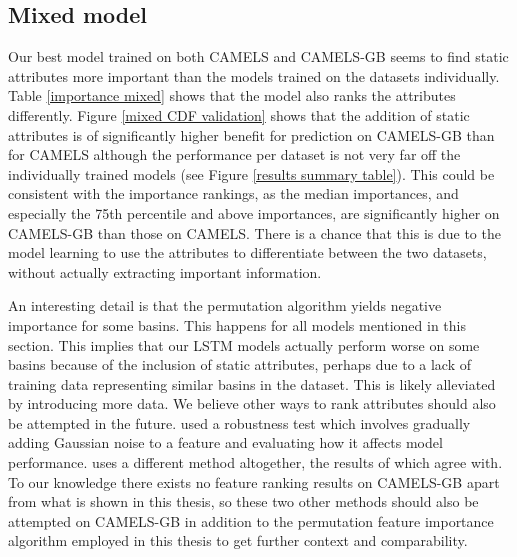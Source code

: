 \subsection{Mixed model}
Our best model trained on both CAMELS and CAMELS-GB seems to find static attributes
more important 
than the models trained on the datasets individually. Table \ref{importance mixed} 
shows that the model also ranks the attributes differently. Figure \ref{mixed CDF validation} 
shows that the addition of static attributes is of significantly higher benefit for 
prediction on CAMELS-GB than for CAMELS although the performance per dataset is not 
very far off the individually trained models (see Figure \ref{results summary table}).
This could be consistent with the importance rankings, as 
the median importances, and especially the 75th percentile and above importances, are 
significantly higher on CAMELS-GB than those on CAMELS. There is a chance that this 
is due to the model learning to use the attributes to differentiate between the 
two datasets, without actually extracting important information.

An interesting detail is that the permutation algorithm yields negative importance 
for some basins. This happens for all models mentioned in this section. 
This implies that our LSTM models actually perform worse 
on some basins because of the inclusion of static attributes, perhaps due to a 
lack of training data representing similar basins in the dataset. This is likely 
alleviated by introducing more data. We believe other ways to rank attributes 
should also be attempted 
in the future. \citet{lstm_second_paper} used a robustness test which 
involves gradually adding Gaussian noise to a feature and evaluating how it 
affects model performance. \citet{OrigCAMELSRanking} 
uses a different method altogether, the results of which \cite{lstm_second_paper} 
agree with. To our knowledge there exists no feature ranking results on CAMELS-GB 
apart from what is shown in this thesis, 
so these two other methods should also be attempted on CAMELS-GB in addition 
to the permutation feature importance algorithm employed in this thesis to get further context and comparability.

